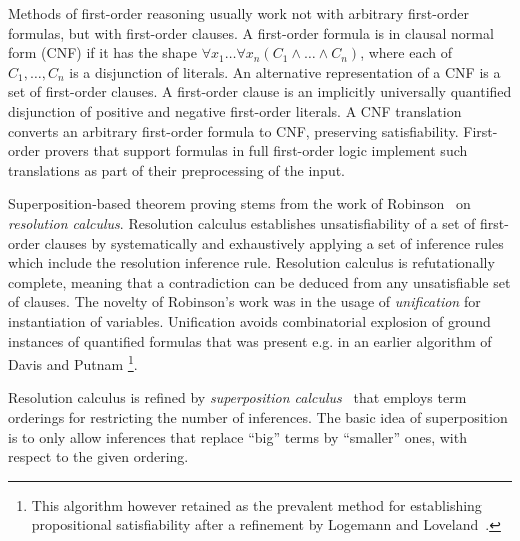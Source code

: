 {Methods of first-order reasoning usually work not with arbitrary first-order formulas, but with first-order clauses. A first-order formula is in clausal normal form (CNF) if it has the shape $\forall x_1\ldots\forall x_n(C_1\wedge\ldots\wedge C_n)$, where each of $C_1,\ldots,C_n$ is a disjunction of literals. An alternative representation of a CNF is a set of first-order clauses. A first-order clause is an implicitly universally quantified disjunction of positive and negative first-order literals. A CNF translation converts an arbitrary first-order formula to CNF, preserving satisfiability. First-order provers that support formulas in full first-order logic implement such translations as part of their preprocessing of the input.

Superposition-based theorem proving stems from the work of Robinson~\cite{Robinson65} on \emph{resolution calculus}. Resolution calculus establishes unsatisfiability of a set of first-order clauses by systematically and exhaustively applying a set of inference rules which include the resolution inference rule. Resolution calculus is refutationally complete, meaning that a contradiction can be deduced from any unsatisfiable set of clauses. The novelty of Robinson's work was in the usage of \emph{unification} for instantiation of variables. Unification avoids combinatorial explosion of ground instances of quantified formulas that was present e.g. in an earlier algorithm of Davis and Putnam \cite{davis1960computing}\footnote{This algorithm however retained as the prevalent method for establishing propositional satisfiability after a refinement by Logemann and Loveland~\cite{davis1962machine}.}.

Resolution calculus is refined by \emph{superposition calculus}~\cite{BG90, BG94} that employs term orderings for restricting the number of inferences. The basic idea of superposition is to only allow inferences that replace ``big'' terms by ``smaller'' ones, with respect to the given ordering.


}
